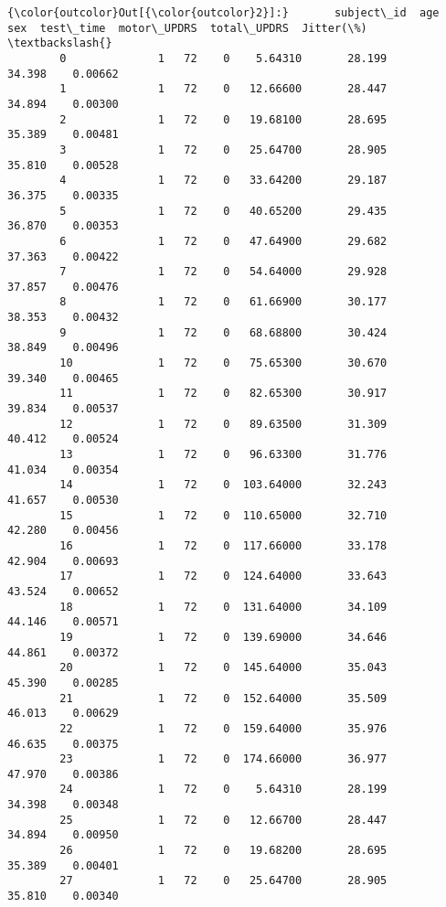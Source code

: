 \documentclass[11pt]{article}
\begin{document}
\begin{Verbatim}[commandchars=\\\{\}]
{\color{outcolor}Out[{\color{outcolor}2}]:}       subject\_id  age  sex  test\_time  motor\_UPDRS  total\_UPDRS  Jitter(\%)  \textbackslash{}
        0              1   72    0    5.64310       28.199       34.398    0.00662   
        1              1   72    0   12.66600       28.447       34.894    0.00300   
        2              1   72    0   19.68100       28.695       35.389    0.00481   
        3              1   72    0   25.64700       28.905       35.810    0.00528   
        4              1   72    0   33.64200       29.187       36.375    0.00335   
        5              1   72    0   40.65200       29.435       36.870    0.00353   
        6              1   72    0   47.64900       29.682       37.363    0.00422   
        7              1   72    0   54.64000       29.928       37.857    0.00476   
        8              1   72    0   61.66900       30.177       38.353    0.00432   
        9              1   72    0   68.68800       30.424       38.849    0.00496   
        10             1   72    0   75.65300       30.670       39.340    0.00465   
        11             1   72    0   82.65300       30.917       39.834    0.00537   
        12             1   72    0   89.63500       31.309       40.412    0.00524   
        13             1   72    0   96.63300       31.776       41.034    0.00354   
        14             1   72    0  103.64000       32.243       41.657    0.00530   
        15             1   72    0  110.65000       32.710       42.280    0.00456   
        16             1   72    0  117.66000       33.178       42.904    0.00693   
        17             1   72    0  124.64000       33.643       43.524    0.00652   
        18             1   72    0  131.64000       34.109       44.146    0.00571   
        19             1   72    0  139.69000       34.646       44.861    0.00372   
        20             1   72    0  145.64000       35.043       45.390    0.00285   
        21             1   72    0  152.64000       35.509       46.013    0.00629   
        22             1   72    0  159.64000       35.976       46.635    0.00375   
        23             1   72    0  174.66000       36.977       47.970    0.00386   
        24             1   72    0    5.64310       28.199       34.398    0.00348   
        25             1   72    0   12.66700       28.447       34.894    0.00950   
        26             1   72    0   19.68200       28.695       35.389    0.00401   
        27             1   72    0   25.64700       28.905       35.810    0.00340   

\end{Verbatim}
\end{document}
